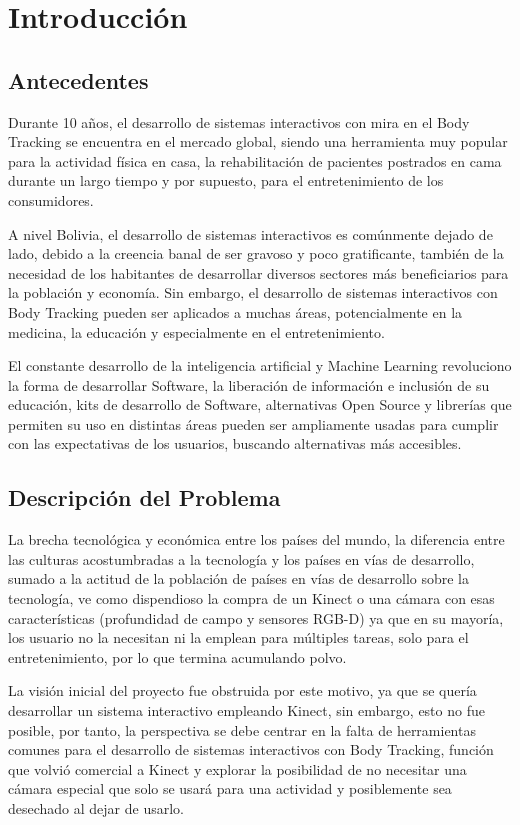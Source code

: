 \chapter{Introducción}

\section{Antecedentes}

Durante 10 años, el desarrollo de sistemas interactivos con mira en el Body Tracking se encuentra en el mercado global, siendo una herramienta muy popular para la actividad física en casa, la rehabilitación de pacientes postrados en cama durante un largo tiempo y por supuesto, para el entretenimiento de los consumidores.

A nivel Bolivia, el desarrollo de sistemas interactivos es comúnmente dejado de lado, debido a la creencia banal de ser gravoso y poco gratificante, también de la necesidad de los habitantes de desarrollar diversos sectores más beneficiarios para la población y economía. Sin embargo, el desarrollo de sistemas interactivos con Body Tracking pueden ser aplicados a muchas áreas, potencialmente en la medicina, la educación y especialmente en el entretenimiento.

El constante desarrollo de la inteligencia artificial y Machine Learning revoluciono la forma de desarrollar Software, la liberación de información e inclusión de su educación, kits de desarrollo de Software, alternativas Open Source y librerías que permiten su uso en distintas áreas pueden ser ampliamente usadas para cumplir con las expectativas de los usuarios, buscando alternativas más accesibles. 

\section{Descripción del Problema}

La brecha tecnológica y económica entre los países del mundo, la diferencia entre las culturas acostumbradas a la tecnología y los países en vías de desarrollo, sumado a la actitud de la población de países en vías de desarrollo sobre la tecnología, ve como dispendioso la compra de un Kinect o una cámara con esas características (profundidad de campo y sensores RGB-D) ya que en su mayoría, los usuario no la necesitan ni la emplean para múltiples tareas, solo para el entretenimiento, por lo que termina acumulando polvo.

La visión inicial del proyecto fue obstruida por este motivo, ya que se quería desarrollar un sistema interactivo empleando Kinect, sin embargo, esto no fue posible, por tanto, la perspectiva se debe centrar en la falta de herramientas comunes para el desarrollo de sistemas interactivos con Body Tracking, función que volvió comercial a Kinect y explorar la posibilidad de no necesitar una cámara especial que solo se usará para una actividad y posiblemente sea desechado al dejar de usarlo.

